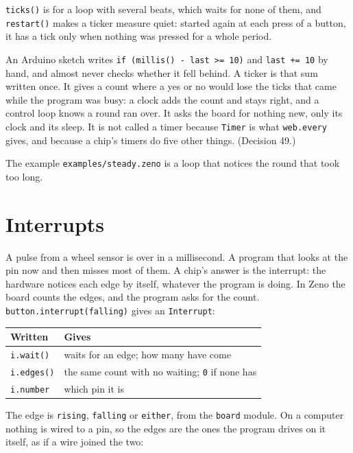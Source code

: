 \verb|ticks()| is for a loop with several beats, which waits for none
of them, and \verb|restart()| makes a ticker measure quiet: started
again at each press of a button, it has a tick only when nothing was
pressed for a whole period.

\begin{why}
An Arduino sketch writes \verb|if (millis() - last >= 10)| and
\verb|last += 10| by hand, and almost never checks whether it fell
behind. A ticker is that sum written once. It gives a count where a
yes or no would lose the ticks that came while the program was busy:
a clock adds the count and stays right, and a control loop knows a
round ran over. It asks the board for nothing new, only its clock and
its sleep. It is not called a timer because \verb|Timer| is what
\verb|web.every| gives, and because a chip's timers do five other
things. (Decision 49.)
\end{why}

The example \verb|examples/steady.zeno| is a loop that notices the
round that took too long.

\section{Interrupts}

A pulse from a wheel sensor is over in a millisecond. A program that
looks at the pin now and then misses most of them. A chip's answer is
the interrupt: the hardware notices each edge by itself, whatever the
program is doing. In Zeno the board counts the edges, and the program
asks for the count. \verb|button.interrupt(falling)| gives an
\verb|Interrupt|:

\begin{center}
\begin{tabular}{ll}
\toprule
Written & Gives \\
\midrule
\verb|i.wait()| & waits for an edge; how many have come \\
\verb|i.edges()| & the same count with no waiting; \verb|0| if none has \\
\verb|i.number| & which pin it is \\
\bottomrule
\end{tabular}
\end{center}

The edge is \verb|rising|, \verb|falling| or \verb|either|, from the
\verb|board| module. On a computer nothing is wired to a pin, so the
edges are the ones the program drives on it itself, as if a wire
joined the two:

